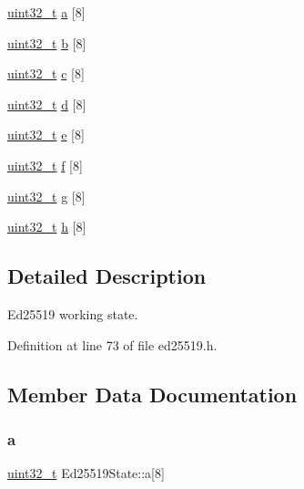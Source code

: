 \begin{DoxyCompactItemize}
\item 
\hyperlink{stdint_8h_a435d1572bf3f880d55459d9805097f62}{uint32\+\_\+t} \hyperlink{structEd25519State_ad5256b987472364028bb7c680eb47fbf}{a} \mbox{[}8\mbox{]}
\item 
\hyperlink{stdint_8h_a435d1572bf3f880d55459d9805097f62}{uint32\+\_\+t} \hyperlink{structEd25519State_ab7959fd632debe6185b2c472467876d8}{b} \mbox{[}8\mbox{]}
\item 
\hyperlink{stdint_8h_a435d1572bf3f880d55459d9805097f62}{uint32\+\_\+t} \hyperlink{structEd25519State_a89709eaf7e108ce3561694b0f5a2d107}{c} \mbox{[}8\mbox{]}
\item 
\hyperlink{stdint_8h_a435d1572bf3f880d55459d9805097f62}{uint32\+\_\+t} \hyperlink{structEd25519State_a1a5b5dcf20f8a5ca52db680cf167e7be}{d} \mbox{[}8\mbox{]}
\item 
\hyperlink{stdint_8h_a435d1572bf3f880d55459d9805097f62}{uint32\+\_\+t} \hyperlink{structEd25519State_aea8e07abf5c03717fff2e06a3d403b05}{e} \mbox{[}8\mbox{]}
\item 
\hyperlink{stdint_8h_a435d1572bf3f880d55459d9805097f62}{uint32\+\_\+t} \hyperlink{structEd25519State_a168d3aecb5fe85de18f5b1262f92c8a1}{f} \mbox{[}8\mbox{]}
\item 
\hyperlink{stdint_8h_a435d1572bf3f880d55459d9805097f62}{uint32\+\_\+t} \hyperlink{structEd25519State_a79c9d128ae5b3c351159268164ca23d4}{g} \mbox{[}8\mbox{]}
\item 
\hyperlink{stdint_8h_a435d1572bf3f880d55459d9805097f62}{uint32\+\_\+t} \hyperlink{structEd25519State_a8d8b974786f20f7a3013f747808d2927}{h} \mbox{[}8\mbox{]}
\end{DoxyCompactItemize}


\subsection{Detailed Description}
Ed25519 working state. 

Definition at line 73 of file ed25519.\+h.



\subsection{Member Data Documentation}
\mbox{\label{structEd25519State_ad5256b987472364028bb7c680eb47fbf}} 
\subsubsection{\texorpdfstring{a}{a}}
{\footnotesize\ttfamily \hyperlink{stdint_8h_a435d1572bf3f880d55459d9805097f62}{uint32\+\_\+t} Ed25519\+State\+::a\mbox{[}8\mbox{]}}



